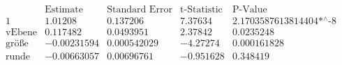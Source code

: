 \[\begin{array}{l|llll}
 \text{} & \text{Estimate} & \text{Standard Error} & \text{t-Statistic} & \text{P-Value} \\
\hline
 1 & 1.01208 & 0.137206 & 7.37634 & \text{2.1703587613814404$\grave{ }$*${}^{\wedge}$-8} \\
 \text{vEbene} & 0.117482 & 0.0493951 & 2.37842 & 0.0235248 \\
 \text{gr{\" o}{\ss}e} & -0.00231594 & 0.000542029 & -4.27274 & 0.000161828 \\
 \text{runde} & -0.00663057 & 0.00696761 & -0.951628 & 0.348419 \\
\end{array}\]

